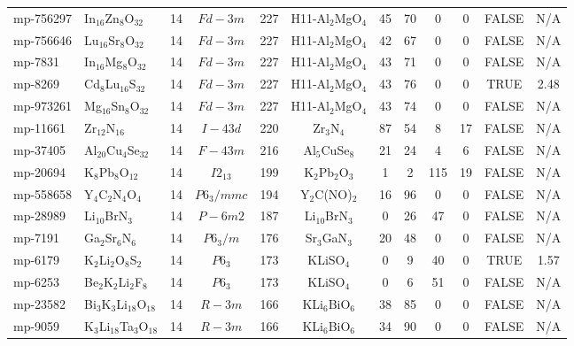 {\begin{longtable}{llcccccccccc}
    mp-756297 & In$_{16}$Zn$_{8}$O$_{32}$ & 14    & $Fd-3m$ & 227   & H11-Al$_{2}$MgO$_{4}$ & 45    & 70    & 0     & 0     & FALSE & N/A \\
    mp-756646 & Lu$_{16}$Sr$_{8}$O$_{32}$ & 14    & $Fd-3m$ & 227   & H11-Al$_{2}$MgO$_{4}$ & 42    & 67    & 0     & 0     & FALSE & N/A \\
    mp-7831 & In$_{16}$Mg$_{8}$O$_{32}$ & 14    & $Fd-3m$ & 227   & H11-Al$_{2}$MgO$_{4}$ & 43    & 71    & 0     & 0     & FALSE & N/A \\
    mp-8269 & Cd$_{8}$Lu$_{16}$S$_{32}$ & 14    & $Fd-3m$ & 227   & H11-Al$_{2}$MgO$_{4}$ & 43    & 76    & 0     & 0     & TRUE  & 2.48  \\
    mp-973261 & Mg$_{16}$Sn$_{8}$O$_{32}$ & 14    & $Fd-3m$ & 227   & H11-Al$_{2}$MgO$_{4}$ & 43    & 74    & 0     & 0     & FALSE & N/A \\
    mp-11661 & Zr$_{12}$N$_{16}$ & 14    & $I-43d$ & 220   & Zr$_{3}$N$_{4}$ & 87    & 54    & 8     & 17    & FALSE & N/A \\
    mp-37405 & Al$_{20}$Cu$_{4}$Se$_{32}$ & 14    & $F-43m$ & 216   & Al$_{5}$CuSe$_{8}$ & 21    & 24    & 4     & 6     & FALSE & N/A \\
    mp-20694 & K$_{8}$Pb$_{8}$O$_{12}$ & 14    & $I2_13$ & 199   & K$_{2}$Pb$_{2}$O$_{3}$ & 1     & 2     & 115   & 19    & FALSE & N/A \\
    mp-558658 & Y$_{4}$C$_{2}$N$_{4}$O$_{4}$ & 14    & $P6_3/mmc$ & 194   & Y$_{2}$C(NO)$_{2}$ & 16    & 96    & 0     & 0     & FALSE & N/A \\
    mp-28989 & Li$_{10}$BrN$_{3}$ & 14    & $P-6m2$ & 187   & Li$_{10}$BrN$_{3}$ & 0     & 26    & 47    & 0     & FALSE & N/A \\
    mp-7191 & Ga$_{2}$Sr$_{6}$N$_{6}$ & 14    & $P6_3/m$ & 176   & Sr$_{3}$GaN$_{3}$ & 20    & 48    & 0     & 0     & FALSE & N/A \\
    mp-6179 & K$_{2}$Li$_{2}$O$_{8}$S$_{2}$ & 14    & $P6_3$ & 173   & KLiSO$_{4}$ & 0     & 9     & 40    & 0     & TRUE  & 1.57  \\
    mp-6253 & Be$_{2}$K$_{2}$Li$_{2}$F$_{8}$ & 14    & $P6_3$ & 173   & KLiSO$_{4}$ & 0     & 6     & 51    & 0     & FALSE & N/A \\
    mp-23582 & Bi$_{3}$K$_{3}$Li$_{18}$O$_{18}$ & 14    & $R-3m$ & 166   & KLi$_{6}$BiO$_{6}$ & 38    & 85    & 0     & 0     & FALSE & N/A \\
    mp-9059 & K$_{3}$Li$_{18}$Ta$_{3}$O$_{18}$ & 14    & $R-3m$ & 166   & KLi$_{6}$BiO$_{6}$ & 34    & 90    & 0     & 0     & FALSE & N/A \\

\end{longtable}}
